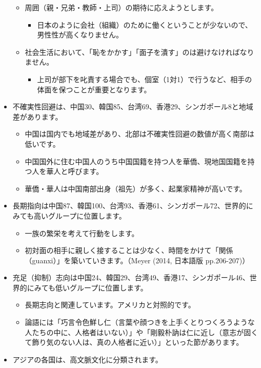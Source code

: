 \documentclass[
]{book}
\providecommand{\tightlist}{%
  \setlength{\itemsep}{0pt}\setlength{\parskip}{0pt}}
\begin{document}
\begin{itemize}
  \begin{itemize}
  \item
    周囲（親・兄弟・教師・上司）の期待に応えようとします。

    \begin{itemize}
    \tightlist
    \item
      日本のように会社（組織）のために働くということが少ないので、男性性が高くなりません。
    \end{itemize}
  \item
    社会生活において、「恥をかかす」「面子を潰す」のは避けなければなりません。

    \begin{itemize}
    \tightlist
    \item
      上司が部下を叱責する場合でも、個室（1対1）で行うなど、相手の体面を保つことが重要となります。
    \end{itemize}
  \end{itemize}
\item
  不確実性回避は、中国30、韓国85、台湾69、香港29、シンガポール8と地域差があります。

  \begin{itemize}
  \item
    中国は国内でも地域差があり、北部は不確実性回避の数値が高く南部は低いです。
  \item
    中国国外に住む中国人のうち中国国籍を持つ人を華僑、現地国国籍を持つ人を華人と呼びます。
  \item
    華僑・華人は中国南部出身（祖先）が多く、起業家精神が高いです。
  \end{itemize}
\item
  長期指向は中国87、韓国100、台湾93、香港61、シンガポール72、世界的にみても高いグループに位置します。

  \begin{itemize}
  \item
    一族の繁栄を考えて行動をします。
  \item
    初対面の相手に親しく接することは少なく、時間をかけて「関係（guanxi）」を築いていきます。（Meyer (2014, 日本語版 pp.206-207)）
  \end{itemize}
\item
  充足（抑制）志向は中国24、韓国29、台湾49、香港17、シンガポール46、世界的にみても低いグループに位置します。

  \begin{itemize}
  \item
    長期志向と関連しています。アメリカと対照的です。
  \item
    論語には「巧言令色鮮し仁（言葉や顔つきを上手くとりつくろうような人たちの中に、人格者はいない）」や「剛毅朴訥は仁に近し（意志が固くて飾り気のない人は、真の人格者に近い）」といった節があります。
  \end{itemize}
\item
  アジアの各国は、高文脈文化に分類されます。


\end{itemize}
\end{document}
